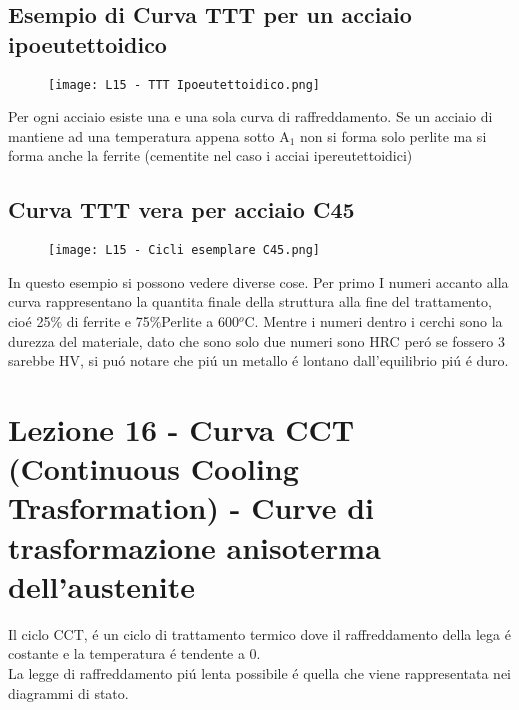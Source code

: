 \documentclass{article}
\begin{document}
{        \subsection{Esempio di Curva TTT per un acciaio ipoeutettoidico}
            \begin{figure}[h!]
                \centering
                \texttt{[image: L15 - TTT Ipoeutettoidico.png]}
            \end{figure}
            Per ogni acciaio esiste una e una sola curva di raffreddamento.
            Se un acciaio di mantiene ad una temperatura appena sotto A$_1$ non si forma solo perlite ma si forma anche la ferrite (cementite nel caso i acciai ipereutettoidici)
        \subsection{Curva TTT vera per acciaio C45}
            \begin{figure}[h!]
                \centering
                \texttt{[image: L15 - Cicli esemplare C45.png]}
            \end{figure}
            In questo esempio si possono vedere diverse cose. Per primo I numeri accanto alla curva rappresentano la quantita finale della struttura alla fine del trattamento, cio\'e 25$\%$ di ferrite e 75$\%$Perlite a 600$^o$C. Mentre i numeri dentro i cerchi sono la durezza del materiale, dato che sono solo due numeri sono HRC per\'o se fossero 3 sarebbe HV, si pu\'o notare che pi\'u un metallo \'e lontano dall'equilibrio pi\'u \'e duro.
    \section{Lezione 16 - Curva CCT (Continuous Cooling Trasformation) - Curve di trasformazione anisoterma dell'austenite}
        Il ciclo CCT, \'e un ciclo di trattamento termico dove il raffreddamento della lega \'e costante e la temperatura \'e tendente a 0.\\
        La legge di raffreddamento pi\'u lenta possibile \'e quella che viene rappresentata nei diagrammi di stato.
}
\end{document}
